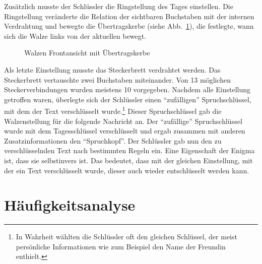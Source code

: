 \documentclass[ngerman, a4paper, footsepline, headsepline, numbers=noenddot]{scrreport}
\newcommand{\figref}[1]{(siehe Abb.~\ref{#1})}
\begin{document}
	Zusätzlich musste der Schlüssler die Ringstellung des Tages einstellen. Die Ringstellung veränderte die Relation der sichtbaren Buchstaben mit der internen Verdrahtung und bewegte die Übertragskerbe \figref{fig:enigma-rotor-contact}, die festlegte, wann sich die Walze links von der aktuellen bewegt.
	
	\begin{figure}[htbp]
		\centering
		\caption{Walzen Frontansicht mit Übertragskerbe}
		\label{fig:enigma-rotor-contact}
	\end{figure}
	
	\newpage
	Als letzte Einstellung musste das Steckerbrett verdrahtet werden. Das Steckerbrett vertauschte zwei Buchstaben miteinander. Von 13 möglichen Steckerverbindungen wurden meistens 10 vorgegeben. Nachdem alle Einstellung getroffen waren, überlegte sich der Schlüssler einen "`zufälligen"' Spruchschlüssel, mit dem der Text verschlüsselt wurde.\footnote{In Wahrheit wählten die Schlüssler oft den gleichen Schlüssel, der meist persönliche Informationen wie zum Beispiel den Name der Freundin enthielt.} Dieser Spruchschlüssel gab die Walzenstellung für die folgende Nachricht an. Der "`zufällige"' Spruchschlüssel wurde mit dem Tagesschlüssel verschlüsselt und ergab zusammen mit anderen Zusatzinformationen den "`Spruchkopf"'. Der Schlüssler gab nun den zu verschlüsselnden Text nach bestimmten Regeln ein. Eine Eigenschaft der Enigma ist, dass sie selbstinvers ist. Das bedeutet, dass mit der gleichen Einstellung, mit der ein Text verschlüsselt wurde, dieser auch wieder entschlüsselt werden kann.
	
	
	\chapter{Häufigkeitsanalyse}
\end{document}
